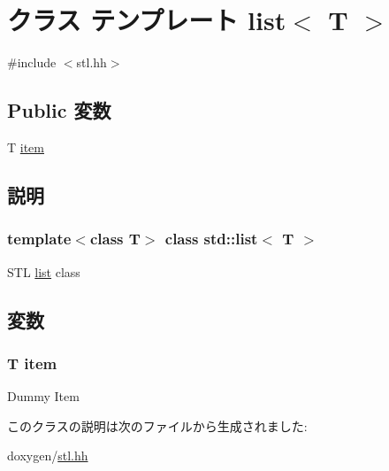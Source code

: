 \hypertarget{classstd_1_1list}{
\section{クラス テンプレート list$<$ T $>$}
\label{classstd_1_1list}
}


{\ttfamily \#include $<$stl.hh$>$}\subsection*{Public 変数}
\begin{DoxyCompactItemize}
\item 
T \hyperlink{classstd_1_1list_aaeb0f0ed34c31a834ce36fe4defd6c5e}{item}
\end{DoxyCompactItemize}


\subsection{説明}
\subsubsection*{template$<$class T$>$ class std::list$<$ T $>$}

STL \hyperlink{classstd_1_1list}{list} class 

\subsection{変数}
\hypertarget{classstd_1_1list_aaeb0f0ed34c31a834ce36fe4defd6c5e}{
\subsubsection[{item}]{\setlength{\rightskip}{0pt plus 5cm}T {\bf item}}}
\label{classstd_1_1list_aaeb0f0ed34c31a834ce36fe4defd6c5e}
Dummy Item 

このクラスの説明は次のファイルから生成されました:\begin{DoxyCompactItemize}
\item 
doxygen/\hyperlink{stl_8hh}{stl.hh}\end{DoxyCompactItemize}
